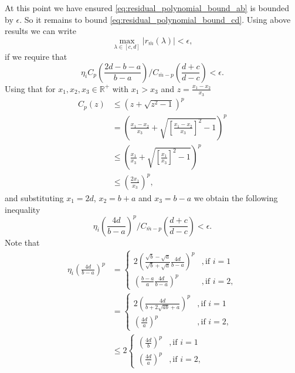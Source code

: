 At this point we have ensured \cref{eq:residual_polynomial_bound_ab} is bounded by $\epsilon$. So it remains to bound \cref{eq:residual_polynomial_bound_cd}. Using above results we can write 
\begin{equation*}
    \max_{\lambda \in [c,d]} |r_{\bar{m}}(\lambda)| < \epsilon,
\end{equation*}
if we require that
\begin{equation}
    \eta_i C_{p}\left(\frac{2d - b - a}{b - a}\right) /C_{\bar{m}-p}\left(\frac{d+c}{d-c}\right) < \epsilon.
    \label{eq:relative_error_bound_mp}
\end{equation}
Using that for $x_1, x_2, x_3 \in \mathbb{R}^+$ with $x_1 > x_3$ and $z = \frac{x_1 - x_2}{x_3}$
\begin{align*}
    C_p(z) & \leq \left(z + \sqrt{z^2 - 1}\right)^p \\
    & = \left( \frac{x_1 - x_2}{x_3} + \sqrt{ \left[\frac{x_1 - x_2}{x_3}\right]^2 -1}\right)^p \\
    & \leq \left( \frac{x_1}{x_3} + \sqrt{ \left[\frac{x_1}{x_3}\right]^2 - 1}\right)^p \\
    & \leq \left( \frac{2x_1}{x_3}\right)^p,
\end{align*}
and substituting $x_1 = 2d$, $x_2 = b + a$ and $x_3 = b - a$ we obtain the following inequality
\begin{equation*}
    \eta_i \left(\frac{4d}{b-a} \right)^p /C_{\bar{m}-p}\left(\frac{d+c}{d-c}\right) < \epsilon. 
\end{equation*}
Note that
\begin{align*}
    \eta_i \left(\frac{4d}{b-a}\right)^p &= 
    \begin{cases}
        2\left(\frac{\sqrt{b} - \sqrt{a}}{\sqrt{b} + \sqrt{a}} \frac{4d}{b-a}\right)^p &, \text{if } i = 1\\
        \left(\frac{b - a}{a}\frac{4d}{b-a}\right)^p &, \text{if } i = 2,
    \end{cases}\\
    &=
    \begin{cases}
        2\left(\frac{4d}{b + 2\sqrt{ab} + a}\right)^p &, \text{if } i = 1\\
        \left(\frac{4d}{a}\right)^p &, \text{if } i = 2,
    \end{cases}\\
    &\leq 2
    \begin{cases}
        \left(\frac{4d}{b}\right)^p &, \text{if } i = 1\\
        \left(\frac{4d}{a}\right)^p &, \text{if } i = 2,
    \end{cases}
\end{align*}
